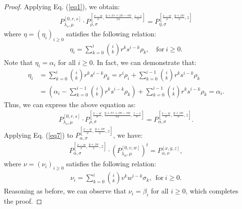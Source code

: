 \documentclass{amsart}
\begin{document}
\begin{proof}
Applying Eq. (\ref{eq1}), we obtain:
\begin{align*}
P_{\lambda_s, \mu}^{[0, r, s]}  \cdot P_{\rho, \sigma}^{\left[ \frac{x-w}{v}, \frac{y+xs+zw-sw}{rv}, \frac{z-s}{r} \right]} =P_{\eta, \sigma}^{[\frac{x-w}{v}, \frac{y+zw}{v}, z]}
\end{align*}
where $\eta=(\eta_i)_{i\geq 0}$ satisfies the following relation:
\begin{align*}
\eta_{i} =\sum_{k=0}^{i} \binom{i}{k} r^k s^{i-k} \rho_{k}, \quad   \text{for}  \   i\geq 0.
\end{align*}
Note that $\eta_i=\alpha_i$ for all $i \geq 0$. In fact, we can demonstrate that:
\begin{align*}
\eta_i&=\sum_{k=0}^{i} \binom{i}{k} r^k s^{i-k} \rho_{k}=r^i \rho_{i}+\sum_{k=0}^{i-1}\binom{i}{k} r^k s^{i-k} \rho_{k}\\ &= \left(\alpha_i-\sum_{k=0}^{i-1} \binom{i}{k} r^k s^{i-k}  \rho_k\right)+\sum_{k=0}^{i-1}\binom{i}{k} r^k s^{i-k} \rho_{k}=\alpha_i.
\end{align*}
Thus, we can express the above equation as:
\begin{align*}
P_{\lambda_s, \mu}^{[0, r, s]}  \cdot P_{\rho, \sigma}^{\left[ \frac{x-w}{v}, \frac{y+xs+zw-sw}{rv}, \frac{z-s}{r} \right]} =P_{\alpha, \sigma}^{[\frac{x-w}{v}, \frac{y+zw}{v}, z]}.
\end{align*}
Applying Eq. (\ref{eq7}) to $P_{\alpha, \sigma}^{[\frac{x-w}{v}, \frac{y+zw}{v}, z]}$, we have:
\begin{align*}
P_{\alpha, \sigma}^{[\frac{x-w}{v}, \frac{y+zw}{v}, z]} \cdot (P_{\lambda_w, \mu}^{[0, v, w]})^t=P_{\alpha, \nu}^{[x, y, z]},
\end{align*}
where $\nu=(\nu_i)_{i\geq 0}$ satisfies the following relation:
\begin{align*}
\nu_i= \sum_{k=0}^{i} \binom{i}{k} v^k w^{i-k} \sigma_{k}, \ \ 
\text{for} \ i\geq 0. 
\end{align*}
 Reasoning as before, we can observe that $\nu_i = \beta_i$ for all $i \geq 0$,  which completes the proof.
\end{proof}
\end{document}
